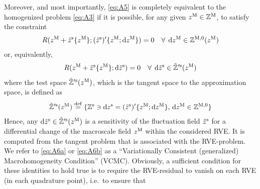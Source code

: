 \documentclass[MikaelDissertation.tex]{subfiles}
\begin{document}
Moreover, and most importantly, \cref{eq:A5} is completely equivalent to the homogenized problem \cref{eq:A3} if it is possible, for any given $z^{\mathrm{M}}\in\mathbb{Z}^{\mathrm{M}}$, to satisfy the constraint
\begin{align}
\label{eq:A6a} R(z^{\mathrm{M}} + \tilde z^{\mathrm{s}}\{z^{\mathrm{M}}\}; (\tilde{z}^{\mathrm{s}})'\{z^{\mathrm{M}};\operatorname{d \!} z^{\mathrm{M}}\}) = 0\quad \forall\;\operatorname{d \!} z^{\mathrm{M}}\in\mathbb{Z}^{\mathrm{M},0}(z^{\mathrm{M}})
\end{align}
or, equivalently,
\begin{align}
\label{eq:A6b} R(z^{\mathrm{M}} + \tilde z^{\mathrm{s}}\{z^{\mathrm{M}}\}; \operatorname{d \!}\tilde{z}^{\mathrm{s}}) = 0\quad \forall\;\operatorname{d \!}\tilde{z}^{\mathrm{s}}\in\tilde{\mathbb{Z}}'^{\mathrm{s}}(z^{\mathrm{M}})
\end{align}
where the test space $\tilde{\mathbb{Z}}'^{\mathrm{s}}(z^{\mathrm{M}})$, which is the tangent space to the approximation space, is defined as
\begin{align}
    \tilde{\mathbb{Z}}'^{\mathrm{s}}(z^{\mathrm{M}})\overset{\mathrm{def}}{=}\{\mathbb{Z}^{\mathrm{s}}\ni \operatorname{d \!} z^{\mathrm{s}} = (\tilde{z}^{\mathrm{s}})'\{z^{\mathrm{M}};\operatorname{d \!} z^{\mathrm{M}}\},\,
    \operatorname{d \!} z^{\mathrm{M}}\in \mathbb{Z}^{\mathrm{M},0}\}
\label{eq:A6c}
\end{align}
Hence, any $\operatorname{d \!} \tilde{z}^{\mathrm{s}}\in\tilde{\mathbb{Z}}'^{\mathrm{s}}(z^{\mathrm{M}})$ is a sensitivity of the fluctuation field $\tilde{z}^{\mathrm{s}}$ for a differential change of the macroscale field $z^{\mathrm{M}}$ within the considered RVE.
It is computed from the tangent problem that is associated with the RVE-problem.
We refer to \cref{eq:A6a} or \cref{eq:A6b} as a ``Variationally Consistent (generalized) Macrohomogeneity Condition'' (VCMC).
Obviously, a sufficient condition for these identities to hold true is to require the RVE-residual to vanish on each RVE (in each quadrature point), i.e.\ to ensure that
\end{document}
